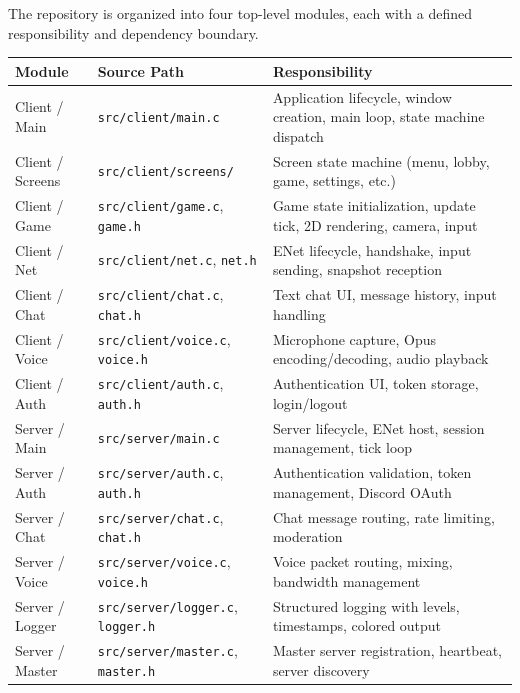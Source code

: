 \documentclass[11pt]{article}
\begin{document}
The repository is organized into four top-level modules, each with a defined responsibility and dependency boundary.

\begin{longtable}{|>{\raggedright\arraybackslash}p{}|>{\raggedright\arraybackslash}p{}|>{\raggedright\arraybackslash}p{}|}
\hline
\textbf{Module} & \textbf{Source Path} & \textbf{Responsibility} \\
\hline
Client / Main & \texttt{src/client/main.c} & Application lifecycle, window creation, main loop, state machine dispatch \\
\hline
Client / Screens & \texttt{src/client/screens/} & Screen state machine (menu, lobby, game, settings, etc.) \\
\hline
Client / Game & \texttt{src/client/game.c}, \texttt{game.h} & Game state initialization, update tick, 2D rendering, camera, input \\
\hline
Client / Net & \texttt{src/client/net.c}, \texttt{net.h} & ENet lifecycle, handshake, input sending, snapshot reception \\
\hline
Client / Chat & \texttt{src/client/chat.c}, \texttt{chat.h} & Text chat UI, message history, input handling \\
\hline
Client / Voice & \texttt{src/client/voice.c}, \texttt{voice.h} & Microphone capture, Opus encoding/decoding, audio playback \\
\hline
Client / Auth & \texttt{src/client/auth.c}, \texttt{auth.h} & Authentication UI, token storage, login/logout \\
\hline
Server / Main & \texttt{src/server/main.c} & Server lifecycle, ENet host, session management, tick loop \\
\hline
Server / Auth & \texttt{src/server/auth.c}, \texttt{auth.h} & Authentication validation, token management, Discord OAuth \\
\hline
Server / Chat & \texttt{src/server/chat.c}, \texttt{chat.h} & Chat message routing, rate limiting, moderation \\
\hline
Server / Voice & \texttt{src/server/voice.c}, \texttt{voice.h} & Voice packet routing, mixing, bandwidth management \\
\hline
Server / Logger & \texttt{src/server/logger.c}, \texttt{logger.h} & Structured logging with levels, timestamps, colored output \\
\hline
Server / Master & \texttt{src/server/master.c}, \texttt{master.h} & Master server registration, heartbeat, server discovery \\

\end{longtable}
\end{document}
